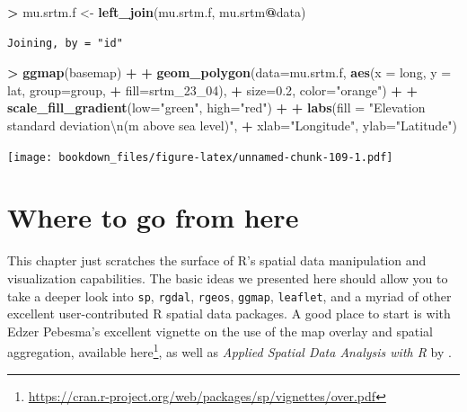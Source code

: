 \documentclass[]{krantz}
\makeatletter
\newenvironment{Shaded}{\begin{snugshade}}{\end{snugshade}}
\newcommand{\KeywordTok}[1]{\textcolor[rgb]{0.27,0.27,0.27}{\textbf{#1}}}
\newcommand{\DataTypeTok}[1]{\textcolor[rgb]{0.27,0.27,0.27}{#1}}
\newcommand{\DecValTok}[1]{\textcolor[rgb]{0.06,0.06,0.06}{#1}}
\newcommand{\FloatTok}[1]{\textcolor[rgb]{0.06,0.06,0.06}{#1}}
\newcommand{\CharTok}[1]{\textcolor[rgb]{0.5,0.5,0.5}{#1}}
\newcommand{\StringTok}[1]{\textcolor[rgb]{0.5,0.5,0.5}{#1}}
\newcommand{\OperatorTok}[1]{\textcolor[rgb]{0.43,0.43,0.43}{\textbf{#1}}}
\newcommand{\NormalTok}[1]{#1}
\renewcommand{\href}[2]{#2\footnote{\url{#1}}}
\newenvironment{kframe}{%
\medskip{}
\setlength{\fboxsep}{.8em}
 \def\at@end@of@kframe{}%
 \ifinner\ifhmode%
  \def\at@end@of@kframe{\end{minipage}}%
  \begin{minipage}{\columnwidth}%
 \fi\fi%
 \def\FrameCommand##1{\hskip\@totalleftmargin \hskip-\fboxsep
 \colorbox{shadecolor}{##1}\hskip-\fboxsep
     \hskip-\linewidth \hskip-\@totalleftmargin \hskip\columnwidth}%
 \MakeFramed {\advance\hsize-\width
   \@totalleftmargin\z@ \linewidth\hsize
   \@setminipage}}%
 {\par\unskip\endMakeFramed%
 \at@end@of@kframe}
\renewenvironment{Shaded}{\begin{kframe}}{\end{kframe}}
\theoremstyle{definition}
\theoremstyle{definition}
\theoremstyle{definition}
\theoremstyle{remark}
\makeatother
\begin{document}
\begin{Shaded}
\begin{Highlighting}[]
\OperatorTok{>}\StringTok{ }\NormalTok{mu.srtm.f <-}\StringTok{ }\KeywordTok{left_join}\NormalTok{(mu.srtm.f, mu.srtm}\OperatorTok{@}\NormalTok{data)}
\end{Highlighting}
\end{Shaded}

\begin{verbatim}
Joining, by = "id"
\end{verbatim}

\begin{Shaded}
\begin{Highlighting}[]
\OperatorTok{>}\StringTok{ }\KeywordTok{ggmap}\NormalTok{(basemap) }\OperatorTok{+}
\OperatorTok{+}\StringTok{     }\KeywordTok{geom_polygon}\NormalTok{(}\DataTypeTok{data=}\NormalTok{mu.srtm.f, }\KeywordTok{aes}\NormalTok{(}\DataTypeTok{x =}\NormalTok{ long, }\DataTypeTok{y =}\NormalTok{ lat, }\DataTypeTok{group=}\NormalTok{group, }
\OperatorTok{+}\StringTok{                                      }\DataTypeTok{fill=}\NormalTok{srtm_23_}\DecValTok{04}\NormalTok{), }
\OperatorTok{+}\StringTok{                  }\DataTypeTok{size=}\FloatTok{0.2}\NormalTok{, }\DataTypeTok{color=}\StringTok{"orange"}\NormalTok{) }\OperatorTok{+}
\OperatorTok{+}\StringTok{     }\KeywordTok{scale_fill_gradient}\NormalTok{(}\DataTypeTok{low=}\StringTok{"green"}\NormalTok{, }\DataTypeTok{high=}\StringTok{"red"}\NormalTok{) }\OperatorTok{+}
\OperatorTok{+}\StringTok{         }\KeywordTok{labs}\NormalTok{(}\DataTypeTok{fill =} \StringTok{"Elevation standard deviation}\CharTok{\textbackslash{}n}\StringTok{(m above sea level)"}\NormalTok{, }
\OperatorTok{+}\StringTok{          }\DataTypeTok{xlab=}\StringTok{"Longitude"}\NormalTok{, }\DataTypeTok{ylab=}\StringTok{"Latitude"}\NormalTok{)}
\end{Highlighting}
\end{Shaded}

\texttt{[image: bookdown\_files/figure-latex/unnamed-chunk-109-1.pdf]}

\section{Where to go from here}\label{where-to-go-from-here}

This chapter just scratches the surface of R's spatial data manipulation
and visualization capabilities. The basic ideas we presented here should
allow you to take a deeper look into \texttt{sp}, \texttt{rgdal},
\texttt{rgeos}, \texttt{ggmap}, \texttt{leaflet}, and a myriad of other
excellent user-contributed R spatial data packages. A good place to
start is with Edzer Pebesma's excellent vignette on the use of the map
overlay and spatial aggregation, available
\href{https://cran.r-project.org/web/packages/sp/vignettes/over.pdf}{here},
as well as \emph{Applied Spatial Data Analysis with R} by
\cite{Bivand13}.



\backmatter
\printindex
\end{document}
